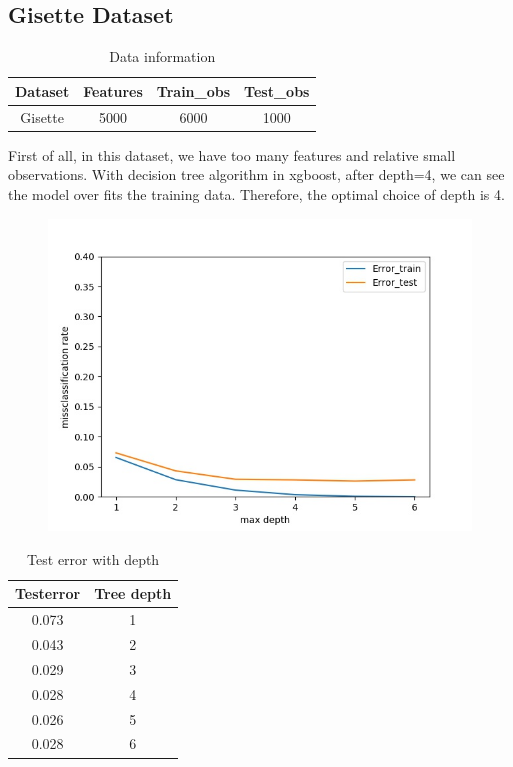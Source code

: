 \documentclass[a4paper]{article}
\begin{document}
\subsection{Gisette Dataset}
\begin{table}[h]
\centering
\caption{Data information}
\begin{tabular}{|c|c|c|c|}
	\hline
	Dataset & Features &\textbf{Train\_obs} & \textbf{Test\_obs}\\
	\hline
    Gisette & 5000 & 6000 & 1000\\
	\hline
\end{tabular}
\end{table}
First of all, in this dataset, we have too many features and relative small observations. With decision tree algorithm in xgboost, after depth=4, we can see the model over fits the training data. Therefore, the optimal choice of depth is 4. 
\begin{figure}[h]
\includegraphics[width=\textwidth]{gisette_result.jpeg}
\caption{}
\label{}
\end{figure}
\begin{table}[H]
\centering
\caption{Test error with depth}
\begin{tabular}{|c|c|}
	\hline
	Testerror & Tree depth \\
	\hline
	0.073 & 1\\
	\hline
	0.043 &2\\
	\hline
	0.029 &3\\
	\hline
     0.028 &4\\
     \hline
     0.026 & 5\\
     \hline
     0.028& 6\\
	\hline
\end{tabular}
\end{table}
\end{document}
